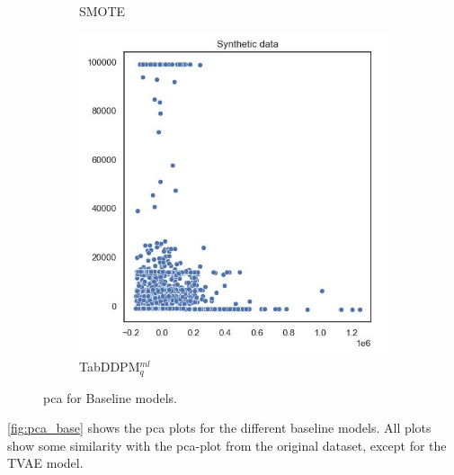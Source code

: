 \begin{figure}[h]
\begin{subfigure}{0.3\textwidth}
		\caption{SMOTE}
	\end{subfigure}
	\begin{subfigure}{0.3\textwidth}
		\centering
		\includegraphics[width=\textwidth]{images/pca/tab-ddpm.jpg}
		\caption{TabDDPM$^{ml}_q$}
	\end{subfigure}
	\caption[PCA plots Baseline Models]{\gls{pca} for Baseline models.}
	\label{fig:pca_base}
\end{figure}

\autoref{fig:pca_base} shows the \gls{pca} plots for the different baseline models. All plots show some similarity with the \gls{pca}-plot from the original dataset,
except for the TVAE model.

